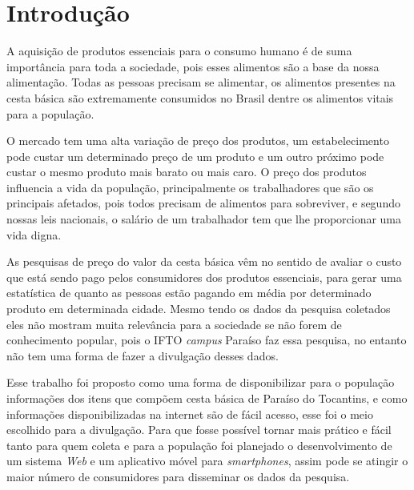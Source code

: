 \documentclass{ifto-tex}
\begin{document}
\tableofcontents*
\cleardoublepage


\textual

\chapter{Introdução}
A aquisição de produtos essenciais para o consumo humano é de suma importância para toda a sociedade, pois esses alimentos são a base da nossa alimentação. Todas as pessoas precisam se alimentar, os alimentos presentes na cesta básica são extremamente consumidos no Brasil dentre os alimentos vitais para a população.

O mercado tem uma alta variação de preço dos produtos, um estabelecimento pode custar um determinado preço de um produto e um outro próximo pode custar o mesmo produto mais barato ou mais caro. O preço dos produtos influencia a vida da população, principalmente os trabalhadores que são os principais afetados, pois todos precisam de alimentos para sobreviver, e segundo nossas leis nacionais, o salário de um trabalhador tem que lhe proporcionar uma vida digna.

As pesquisas de preço do valor da cesta básica vêm no sentido de avaliar o custo que está sendo pago pelos consumidores dos produtos essenciais, para gerar uma estatística de quanto as pessoas estão pagando em média por determinado produto em determinada cidade. Mesmo tendo os dados da pesquisa coletados eles não mostram muita relevância para a sociedade se não forem de conhecimento popular, pois o IFTO \textit{campus} Paraíso faz essa pesquisa, no entanto não tem uma forma de fazer a divulgação desses dados.

Esse trabalho foi proposto como uma forma de disponibilizar para o população informações dos itens que compõem cesta básica de Paraíso do Tocantins, e como informações disponibilizadas na internet são de fácil acesso, esse foi o meio escolhido para a divulgação. Para que fosse possível tornar mais prático e fácil tanto para quem coleta e para a população foi planejado o desenvolvimento de um sistema \textit{Web} e um aplicativo móvel para \textit{smartphones}, assim pode se atingir o maior número de consumidores para disseminar os dados da pesquisa.
\end{document}
